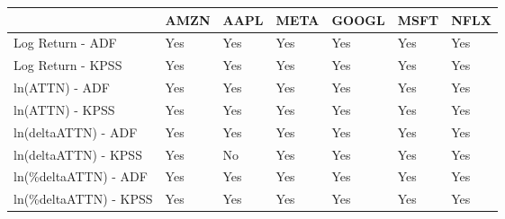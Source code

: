 \begin{tabular}{lllllll}
\toprule
{} & AMZN & AAPL & META & GOOGL & MSFT & NFLX \\
\midrule
Log Return - ADF      &  Yes &  Yes &  Yes &   Yes &  Yes &  Yes \\
Log Return - KPSS     &  Yes &  Yes &  Yes &   Yes &  Yes &  Yes \\
ln(ATTN) - ADF        &  Yes &  Yes &  Yes &   Yes &  Yes &  Yes \\
ln(ATTN) - KPSS       &  Yes &  Yes &  Yes &   Yes &  Yes &  Yes \\
ln(deltaATTN) - ADF   &  Yes &  Yes &  Yes &   Yes &  Yes &  Yes \\
ln(deltaATTN) - KPSS  &  Yes &   No &  Yes &   Yes &  Yes &  Yes \\
ln(\%deltaATTN) - ADF  &  Yes &  Yes &  Yes &   Yes &  Yes &  Yes \\
ln(\%deltaATTN) - KPSS &  Yes &  Yes &  Yes &   Yes &  Yes &  Yes \\
\bottomrule
\end{tabular}
